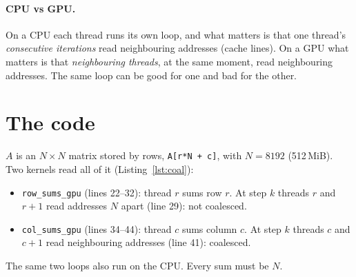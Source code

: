 \documentclass[11pt,a4paper]{article}
\let\origtexttt\texttt
\renewcommand{\texttt}[1]{\textcolor{black!60}{\origtexttt{#1}}}
\begin{document}
\paragraph{CPU vs GPU.} On a CPU each thread runs its own loop, and what matters is that one
thread's \emph{consecutive iterations} read neighbouring addresses (cache lines). On a GPU what
matters is that \emph{neighbouring threads}, at the same moment, read neighbouring addresses.
The same loop can be good for one and bad for the other.

\section{The code}
$A$ is an $N\times N$ matrix stored by rows, \texttt{A[r*N + c]}, with $N = 8192$ (512\,MiB).
Two kernels read all of it (Listing~\ref{lst:coal}):
\begin{itemize}
  \item \texttt{row\_sums\_gpu} (lines 22--32): thread $r$ sums row $r$. At step $k$ threads
        $r$ and $r+1$ read addresses $N$ apart (line 29): not coalesced.
  \item \texttt{col\_sums\_gpu} (lines 34--44): thread $c$ sums column $c$. At step $k$ threads
        $c$ and $c+1$ read neighbouring addresses (line 41): coalesced.
\end{itemize}
The same two loops also run on the CPU. Every sum must be $N$.
\end{document}
